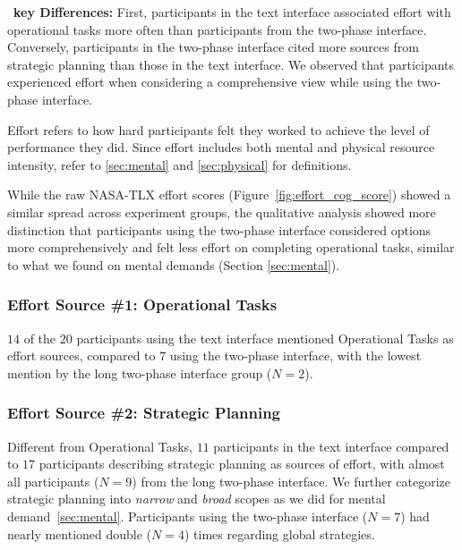 \begin{tldrbox}
   \faKey~\textbf{key Differences:} First, participants in the text interface associated effort with operational tasks more often than participants from the two-phase interface. Conversely, participants in the two-phase interface cited more sources from strategic planning than those in the text interface. We observed that participants experienced effort when considering a comprehensive view while using the two-phase interface.
   
\end{tldrbox}
Effort refers to how hard participants felt they worked to achieve the level of performance they did. Since effort includes both mental and physical resource intensity, refer to \cref{sec:mental} and \cref{sec:physical} for definitions.

While the raw NASA-TLX effort scores (Figure~\ref{fig:effort_cog_score}) showed a similar spread across experiment groups, the qualitative analysis showed more distinction that participants using the two-phase interface considered options more comprehensively and felt less effort on completing operational tasks, similar to what we found on mental demands (Section \ref{sec:mental}). 


\subsubsection{Effort Source \#1: Operational Tasks} $14$ of the $20$ participants using the text interface mentioned Operational Tasks as effort sources, compared to $7$ using the two-phase interface, with the lowest mention by the long two-phase interface group ($N=2$). 

\subsubsection{Effort Source \#2: Strategic Planning} Different from Operational Tasks, $11$ participants in the text interface compared to $17$ participants describing strategic planning as sources of effort, with almost all participants ($N=9$) from the long two-phase interface. We further categorize strategic planning into \textit{narrow} and \textit{broad} scopes as we did for mental demand~\cref{sec:mental}. Participants using the two-phase interface ($N=7$) had nearly mentioned double ($N=4$) times regarding global strategies. 


